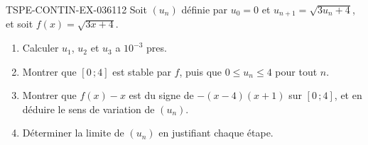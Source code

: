 \begin{exercice}{TSPE-CONTIN-EX-036}{1}{12}
Soit $(u_n)$ définie par $u_0 = 0$ et $u_{n+1} = \sqrt{3u_n + 4}$, et soit $f(x) = \sqrt{3x+4}$.
\begin{enumerate}
  \item Calculer $u_1$, $u_2$ et $u_3$ a $10^{-3}$ pres.
  \item Montrer que $[0\,;4]$ est stable par $f$, puis que $0 \leq u_n \leq 4$ pour tout $n$.
  \item Montrer que $f(x) - x$ est du signe de $-(x-4)(x+1)$ sur $[0\,;4]$, et en déduire le sens de variation de $(u_n)$.
  \item Déterminer la limite de $(u_n)$ en justifiant chaque étape.
\end{enumerate}
\end{exercice}
